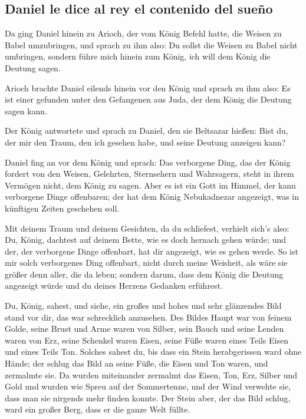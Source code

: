 \hypertarget{daniel-le-dice-al-rey-el-contenido-del-sueuxf1o}{%
\subsection{Daniel le dice al rey el contenido del
sueño}\label{daniel-le-dice-al-rey-el-contenido-del-sueuxf1o}}

 Da ging Daniel hinein zu Arioch, der vom König Befehl
hatte, die Weisen zu Babel umzubringen, und sprach zu ihm also: Du
sollst die Weisen zu Babel nicht umbringen, sondern führe mich hinein
zum König, ich will dem König die Deutung sagen.

 Arioch brachte Daniel eilends hinein vor den König und
sprach zu ihm also: Es ist einer gefunden unter den Gefangenen aus Juda,
der dem König die Deutung sagen kann.

 Der König antwortete und sprach zu Daniel, den sie
Beltsazar hießen: Bist du, der mir den Traum, den ich gesehen habe, und
seine Deutung anzeigen kann?

 Daniel fing an vor dem König und sprach: Das verborgene
Ding, das der König fordert von den Weisen, Gelehrten, Sternsehern und
Wahrsagern, steht in ihrem Vermögen nicht, dem König zu sagen.
 Aber es ist ein Gott im Himmel, der kann verborgene
Dinge offenbaren; der hat dem König Nebukadnezar angezeigt, was in
künftigen Zeiten geschehen soll.

 Mit deinem Traum und deinem Gesichten, da du schliefest,
verhielt sich's also: Du, König, dachtest auf deinem Bette, wie es doch
hernach gehen würde; und der, der verborgene Dinge offenbart, hat dir
angezeigt, wie es gehen werde.  So ist mir solch
verborgenes Ding offenbart, nicht durch meine Weisheit, als wäre sie
größer denn aller, die da leben; sondern darum, dass dem König die
Deutung angezeigt würde und du deines Herzens Gedanken erführest.

 Du, König, sahest, und siehe, ein großes und hohes und
sehr glänzendes Bild stand vor dir, das war schrecklich anzusehen.
 Des Bildes Haupt war von feinem Golde, seine Brust und
Arme waren von Silber, sein Bauch und seine Lenden waren von Erz,
 seine Schenkel waren Eisen, seine Füße waren eines Teils
Eisen und eines Teils Ton.  Solches sahest du, bis dass
ein Stein herabgerissen ward ohne Hände; der schlug das Bild an seine
Füße, die Eisen und Ton waren, und zermalmte sie.  Da
wurden miteinander zermalmt das Eisen, Ton, Erz, Silber und Gold und
wurden wie Spreu auf der Sommertenne, und der Wind verwehte sie, dass
man sie nirgends mehr finden konnte. Der Stein aber, der das Bild
schlug, ward ein großer Berg, dass er die ganze Welt füllte.

